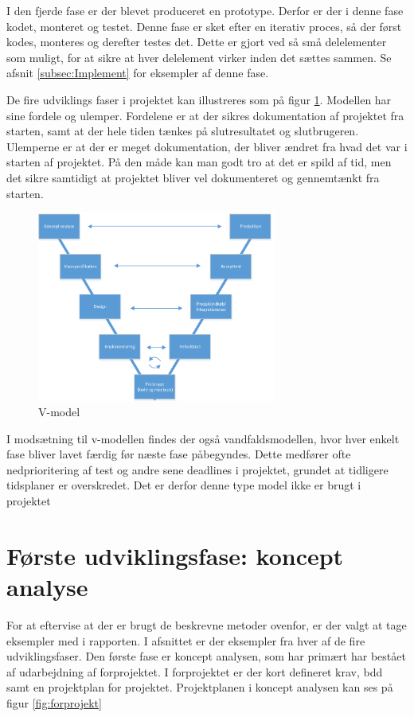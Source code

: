 I den fjerde fase er der blevet produceret en prototype. Derfor er der i denne fase kodet, monteret og testet. Denne fase er sket efter en iterativ proces, så der først kodes, monteres og derefter testes det. Dette er gjort ved så små delelementer som muligt, for at sikre at hver delelement virker inden det sættes sammen. Se afsnit \ref{subsec:Implement} for eksempler af denne fase. 

De fire udviklings faser i projektet kan illustreres som på figur \ref{fig:v-model}. Modellen har sine fordele og ulemper. Fordelene er at der sikres dokumentation af projektet fra starten, samt at der hele tiden tænkes på slutresultatet og slutbrugeren. Ulemperne er at der er meget dokumentation, der bliver ændret fra hvad det var i starten af projektet. På den måde kan man godt tro at det er spild af tid, men det sikre samtidigt at projektet bliver vel dokumenteret og gennemtænkt fra starten.

\begin{figure}[H]
	\centering
	\includegraphics[width=0.7\textwidth]{billeder/Hovedrapport/V-model.PDF}
	\caption{V-model}
	\label{fig:v-model}
\end{figure}

I modsætning til v-modellen findes der også vandfaldsmodellen, hvor hver enkelt fase bliver lavet færdig før næste fase påbegyndes. Dette medfører ofte nedprioritering af test og andre sene deadlines i projektet, grundet at tidligere tidsplaner er overskredet. Det er derfor denne type model ikke er brugt i projektet
\newpage

\section{Første udviklingsfase: koncept analyse}
For at eftervise at der er brugt de beskrevne metoder ovenfor, er der valgt at tage eksempler med i rapporten. I afsnittet er der eksempler fra hver af de fire udviklingsfaser. Den første fase er koncept analysen, som har primært har bestået af udarbejdning af forprojektet. I forprojektet er der kort defineret krav, bdd samt en projektplan for projektet. Projektplanen i koncept analysen kan ses på figur \ref{fig:forprojekt}

